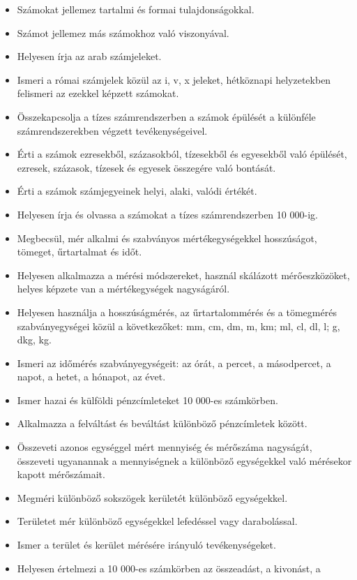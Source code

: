 \begin{itemize}
\item
  Számokat jellemez tartalmi és formai tulajdonságokkal.
\item
  Számot jellemez más számokhoz való viszonyával.
\item
  Helyesen írja az arab számjeleket.
\item
  Ismeri a római számjelek közül az i, v, x jeleket, hétköznapi
  helyzetekben felismeri az ezekkel képzett számokat.
\item
  Összekapcsolja a tízes számrendszerben a számok épülését a különféle
  számrendszerekben végzett tevékenységeivel.
\item
  Érti a számok ezresekből, százasokból, tízesekből és egyesekből való
  épülését, ezresek, százasok, tízesek és egyesek összegére való
  bontását.
\item
  Érti a számok számjegyeinek helyi, alaki, valódi értékét.
\item
  Helyesen írja és olvassa a számokat a tízes számrendszerben 10 000-ig.
\item
  Megbecsül, mér alkalmi és szabványos mértékegységekkel hosszúságot,
  tömeget, űrtartalmat és időt.
\item
  Helyesen alkalmazza a mérési módszereket, használ skálázott
  mérőeszközöket, helyes képzete van a mértékegységek nagyságáról.
\item
  Helyesen használja a hosszúságmérés, az űrtartalommérés és a
  tömegmérés szabványegységei közül a következőket: mm, cm, dm, m, km;
  ml, cl, dl, l; g, dkg, kg.
\item
  Ismeri az időmérés szabványegységeit: az órát, a percet, a
  másodpercet, a napot, a hetet, a hónapot, az évet.
\item
  Ismer hazai és külföldi pénzcímleteket 10 000-es számkörben.
\item
  Alkalmazza a felváltást és beváltást különböző pénzcímletek között.
\item
  Összeveti azonos egységgel mért mennyiség és mérőszáma nagyságát,
  összeveti ugyanannak a mennyiségnek a különböző egységekkel való
  mérésekor kapott mérőszámait.
\item
  Megméri különböző sokszögek kerületét különböző egységekkel.
\item
  Területet mér különböző egységekkel lefedéssel vagy darabolással.
\item
  Ismer a terület és kerület mérésére irányuló tevékenységeket.
\item
  Helyesen értelmezi a 10 000-es számkörben az összeadást, a kivonást, a

\end{itemize}
